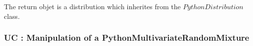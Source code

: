 The return objet is a distribution which inherites from the $PythonDistribution$ class.

\subsubsection{UC : Manipulation of a PythonMultivariateRandomMixture}
